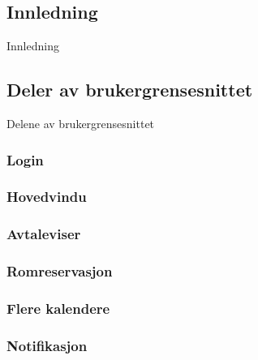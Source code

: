 \subsection{Innledning}
Innledning

\subsection{Deler av brukergrensesnittet}
Delene av brukergrensesnittet

\subsubsection{Login}


\subsubsection{Hovedvindu}


\subsubsection{Avtaleviser}


\subsubsection{Romreservasjon}


\subsubsection{Flere kalendere}


\subsubsection{Notifikasjon}